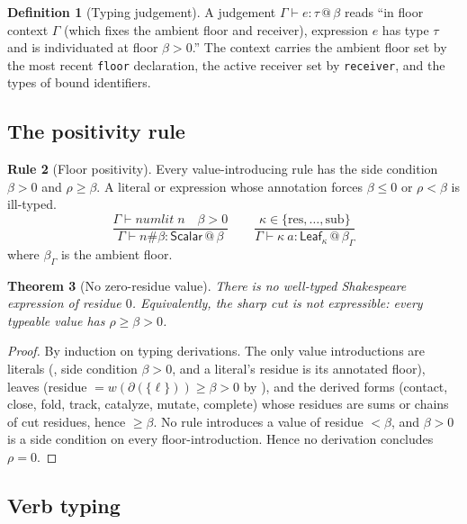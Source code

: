 \documentclass[11pt,a4paper]{article}
\theoremstyle{thmstyle}
\newtheorem{theorem}{Theorem}[section]
\theoremstyle{definition}
\newtheorem{definition}[theorem]{Definition}
\newtheorem{rulename}[theorem]{Rule}
\theoremstyle{remark}
\newcommand{\flo}{\beta}
\newcommand{\res}{\rho}
\newcommand{\cut}{\partial}
\newcommand{\shk}[1]{\texttt{#1}}
\begin{document}
\begin{definition}[Typing judgement]
\label{def:judgement}
A judgement $\Gamma\vdash e:\tau\,@\,\flo$ reads ``in floor context
$\Gamma$ (which fixes the ambient floor and receiver), expression $e$ has
type $\tau$ and is individuated at floor $\flo>0$.'' The context carries
the ambient floor set by the most recent \shk{floor} declaration, the
active receiver set by \shk{receiver}, and the types of bound identifiers.
\end{definition}

\subsection{The positivity rule}

\begin{rulename}[Floor positivity]
\label{rule:positive}
Every value-introducing rule has the side condition $\flo>0$ and
$\res\ge\flo$. A literal or expression whose annotation forces $\flo\le0$
or $\res<\flo$ is ill-typed.
\[
\frac{\Gamma\vdash\textit{numlit}\;n \quad \flo>0}
     {\Gamma\vdash n\#\flo:\mathsf{Scalar}\,@\,\flo}
\qquad
\frac{\kappa\in\{\mathrm{res},\dots,\mathrm{sub}\}}
     {\Gamma\vdash \kappa\ a:\mathsf{Leaf}_\kappa\,@\,\flo_\Gamma}
\]
where $\flo_\Gamma$ is the ambient floor.
\end{rulename}

\begin{theorem}[No zero-residue value]
\label{thm:no-zero-value}
There is no well-typed Shakespeare expression of residue $0$. Equivalently,
the sharp cut is not expressible: every typeable value has
$\res\ge\flo>0$.
\end{theorem}

\begin{proof}
By induction on typing derivations. The only value introductions are
literals (, side condition $\flo>0$, and a literal's
residue is its annotated floor), leaves (residue
$=w(\cut(\{\ell\}))\ge\flo>0$ by ), and the derived
forms (contact, close, fold, track, catalyze, mutate, complete) whose
residues are sums or chains of cut residues, hence $\ge\flo$. No rule
introduces a value of residue $<\flo$, and $\flo>0$ is a side condition on
every floor-introduction. Hence no derivation concludes $\res=0$.
\end{proof}

\subsection{Verb typing}
\end{document}
